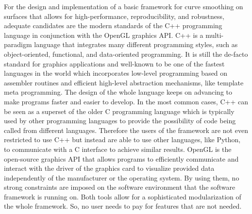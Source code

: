 \documentclass{stdlocal}
\begin{document}
For the design and implementation of a basic framework for curve smoothing on surfaces that allows for high-performance, reproducibility, and robustness, adequate candidates are the modern standards of the C++ programming language in conjunction with the OpenGL graphics API.
C++ is a multi-paradigm language that integrates many different programming styles, such as object-oriented, functional, and data-oriented programming.
It is still the de-facto standard for graphics applications and well-known to be one of the fastest languages in the world which incorporates low-level programming based on assembler routines and efficient high-level abstraction mechanisms, like template meta programming.
The design of the whole language keeps on advancing to make programs faster and easier to develop.
In the most common cases, C++ can be seen as a superset of the older C programming language which is typically used by other programming languages to provide the possibility of code being called from different languages.
Therefore the users of the framework are not even restricted to use C++ but instead are able to use other languages, like Python, to communicate with a C interface to achieve similar results.
OpenGL is the open-source graphics API that allows programs to efficiently communicate and interact with the driver of the graphics card to visualize provided data independently of the manufacturer or the operating system.
By using them, no strong constraints are imposed on the software environment that the software framework is running on.
Both tools allow for a sophisticated modularization of the whole framework.
So, no user needs to pay for features that are not needed. \\
\autocite{stroustrup2014,meyers2014,vandevoorde2018,reddy2011,cppreference,isocpp,opengl}
\end{document}
